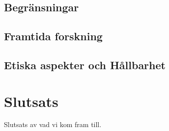 \documentclass[]{kththesis}
\begin{document}
\section{Begränsningar}

\section{Framtida forskning}

\section{Etiska aspekter och Hållbarhet}




\chapter{Slutsats}  
Slutsats av vad vi kom fram till.
\end{document}

